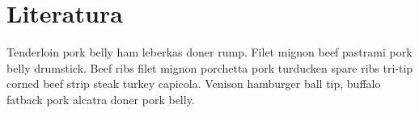 \documentclass{article}
\begin{document}
\restoregeometry

\section{Literatura}
    Tenderloin pork belly ham leberkas doner rump. Filet mignon beef pastrami pork belly drumstick. Beef ribs filet mignon porchetta pork turducken spare ribs tri-tip corned beef strip steak turkey capicola. Venison hamburger ball tip, buffalo fatback pork alcatra doner pork belly.
\end{document}
